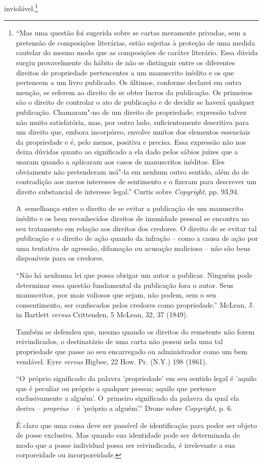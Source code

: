 inviolável.\footnote{``Mas uma questão foi sugerida sobre se cartas
  meramente privadas, sem a pretensão de composições literárias, estão
  sujeitas à proteção de uma medida cautelar do mesmo modo que as
  composições de caráter literário. Essa dúvida surgiu provavelmente do
  hábito de não se distinguir entre os diferentes direitos de
  propriedade pertencentes a um manuscrito inédito e os que pertencem a
  um livro publicado. Os últimos, conforme declarei em outra menção, se
  referem ao direito de se obter lucros da publicação. Os primeiros são
  o direito de controlar o ato de publicação e de decidir se haverá
  qualquer publicação. Chamaram"-no de um direito de propriedade;
  expressão talvez não muito satisfatória, mas, por outro lado,
  suficientemente descritiva para um direito que, embora incorpóreo,
  envolve muitos dos elementos essenciais da propriedade e é, pelo
  menos, positiva e precisa. Essa expressão não nos deixa dúvidas quanto
  ao significado a ela dado pelos sábios juízes que a usaram quando a
  aplicaram aos casos de manuscritos inéditos. Eles obviamente não
  pretenderam usá"-la em nenhum outro sentido, além do de contradição aos
  meros interesses de sentimento e o fizeram para descrever um direito
  substancial de interesse legal.'' Curtis sobre \emph{Copyright}, pp.
  93,94.

  A~semelhança entre o direito de se evitar a publicação de um
  manuscrito inédito e os bem reconhecidos direitos de imunidade pessoal
  se encontra no seu tratamento em relação aos direitos dos credores. O
  direito de se evitar tal publicação e o direito de ação quando da
  infração -- como a causa de ação por uma tentativa de agressão,
  difamação ou acusação maliciosa -- não são bens disponíveis para os
  credores.

  ``Não há nenhuma lei que possa obrigar um autor a publicar. Ninguém
  pode determinar essa questão fundamental da publicação fora o autor.
  Seus manuscritos, por mais valiosos que sejam, não podem, sem o seu
  consentimento, ser confiscados pelos credores como propriedade.''
  McLean, J. in Bartlett \emph{versus} Crittenden, 5 McLean, 32, 37
  (1849).

  Também se defendeu que, mesmo quando os direitos do remetente não
  forem reivindicados, o destinatário de uma carta não possui nela uma
  tal propriedade que passe ao seu encarregado ou administrador como um
  bem vendável. Eyre \emph{versus} Higbee, 22 How. Pr. (N.Y.) 198
  (1861).

  ``O~próprio significado da palavra 'propriedade' em seu sentido legal
  é 'aquilo que é peculiar ou próprio a qualquer pessoa; aquilo que
  pertence exclusivamente a alguém'. O~primeiro significado da palavra
  da qual ela deriva -- \emph{proprius --} é 'próprio a alguém'.'' Drone
  sobre \emph{Copyright}, p. 6.

  É claro que uma coisa deve ser passível de identificação para poder
  ser objeto de posse exclusiva. Mas quando sua identidade pode ser
  determinada de modo que a posse individual possa ser reivindicada, é
  irrelevante a sua corporeidade ou incorporeidade.}

